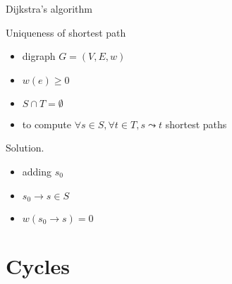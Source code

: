 \begin{frame}{Dijkstra's algorithm}
  \begin{exampleblock}{Uniqueness of shortest path }
    \begin{itemize}
      \item digraph $G = (V, E, w)$
      \item $w(e) \ge 0$
      \item $S \cap T = \emptyset$
      \item to compute $\forall s \in S, \forall t \in T, s \leadsto t$ shortest paths
    \end{itemize}
  \end{exampleblock}

  \begin{block}{Solution.}
    \begin{itemize}
      \item adding $s_{0}$
      \item $s_{0} \to s \in S$
      \item $w(s_{0} \to s) = 0$
    \end{itemize}
  \end{block}
\end{frame}
\section{Cycles}

